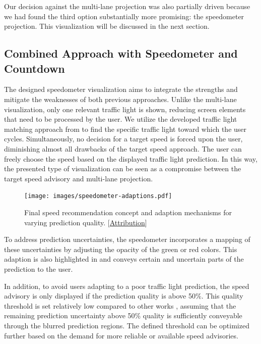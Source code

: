 Our decision against the multi-lane projection was also partially driven because we had found the third option substantially more promising: the speedometer projection. This visualization will be discussed in the next section.

\subsection{Combined Approach with Speedometer and Countdown}

The designed speedometer visualization aims to integrate the strengths and mitigate the weaknesses of both previous approaches. Unlike the multi-lane visualization, only one relevant traffic light is shown, reducing screen elements that need to be processed by the user. We utilize the developed traffic light matching approach from  to find the specific traffic light toward which the user cycles. Simultaneously, no decision for a target speed is forced upon the user, diminishing almost all drawbacks of the target speed approach. The user can freely choose the speed based on the displayed traffic light prediction. In this way, the presented type of visualization can be seen as a compromise between the target speed advisory and multi-lane projection.

\begin{figure}[t]
\centering
\texttt{[image: images/speedometer-adaptions.pdf]}
\caption{Final speed recommendation concept and adaption mechanisms for varying prediction quality. [\hyperref[attribution]{Attribution}]}
\label{fig:speedometer-adaptions}
\end{figure}

To address prediction uncertainties, the speedometer incorporates a mapping of these uncertainties by adjusting the opacity of the green or red colors. This adaption is also highlighted in  and conveys certain and uncertain parts of the prediction to the user. 

In addition, to avoid users adapting to a poor traffic light prediction, the speed advisory is only displayed if the prediction quality is above 50\%. This quality threshold is set relatively low compared to other works \cite{protschky_extensive_2014, protschky_adaptive_2014}, assuming that the remaining prediction uncertainty above 50\% quality is sufficiently conveyable through the blurred prediction regions. The defined threshold can be optimized further based on the demand for more reliable or available speed advisories. 

